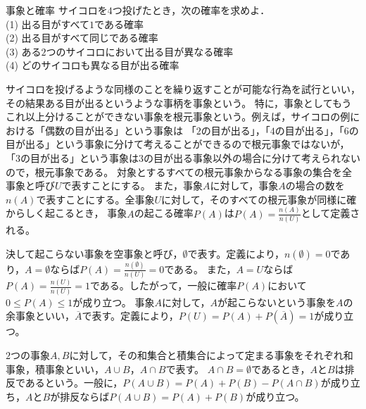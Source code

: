 \begin{問題}{事象と確率} %
サイコロを$4$つ投げたとき，次の確率を求めよ．
\\
(1) 出る目がすべて$1$である確率\\
(2) 出る目がすべて同じである確率\\
(3) ある$2$つのサイコロにおいて出る目が異なる確率\\
(4) どのサイコロも異なる目が出る確率
\end{問題}

\begin{解説}
サイコロを投げるような同様のことを繰り返すことが可能な行為を試行といい，その結果ある目が出るというような事柄を事象という。
特に，事象としてもうこれ以上分けることができない事象を根元事象という。例えば，サイコロの例における「偶数の目が出る」という事象は
「$2$の目が出る」，「$4$の目が出る」，「$6$の目が出る」という事象に分けて考えることができるので根元事象ではないが，
「$3$の目が出る」という事象は$3$の目が出る事象以外の場合に分けて考えられないので，根元事象である。
対象とするすべての根元事象からなる事象の集合を全事象と呼び$U$で表すことにする。
また，事象$A$に対して，事象$A$の場合の数を$n(A)$で表すことにする。全事象$U$に対して，そのすべての根元事象が同様に確からしく起こるとき，
事象$A$の起こる確率$P(A)$は$P(A)=\frac{n(A)}{n(U)}$として定義される。

決して起こらない事象を空事象と呼び，$\emptyset$で表す。定義により，$n(\emptyset)=0$であり，$A=\emptyset$ならば$P(A)=\frac{n(\emptyset)}{n(U)}=0$である。
また，$A=U$ならば$P(A)=\frac{n(U)}{n(U)}=1$である。したがって，一般に確率$P(A)$において$0\leq P(A)\leq 1$が成り立つ。
事象$A$に対して，$A$が起こらないという事象を$A$の余事象といい，$\overline{A}$で表す。定義により，$P(U)=P(A)+P(\overline{A})=1$が成り立つ。

$2$つの事象$A,B$に対して，その和集合と積集合によって定まる事象をそれぞれ和事象，積事象といい，$A\cup B$，$A\cap B$で表す。
$A\cap B=\emptyset$であるとき，$A$と$B$は排反であるという。一般に，$P(A\cup B)=P(A)+P(B)-P(A\cap B)$が成り立ち，$A$と$B$が排反ならば$P(A\cup B)=P(A)+P(B)$が成り立つ。
\end{解説}
